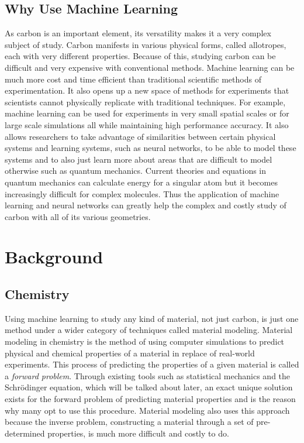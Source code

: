 \documentclass[12pt, abstract = true]{scrartcl}
\begin{document}
\subsection{Why Use Machine Learning}
As carbon is an important element, its versatility makes it a very
complex subject of study. Carbon manifests in various physical forms,
called allotropes, each with very different properties. Because of
this, studying carbon can be difficult and very expensive with conventional
methods. Machine learning can be much more cost and time efficient than traditional
scientific methods of experimentation. It also opens up a new space of methods for 
experiments that scientists cannot physically replicate with traditional techniques. 
For example, machine learning can be used for experiments in very small spatial
scales or for large scale simulations all while maintaining high
performance accuracy. It also allows researchers to take advantage of similarities 
between certain physical systems and learning systems, such as neural networks, to be 
able to model these systems and to also just learn more about areas that are difficult 
to model otherwise such as quantum mechanics. Current theories and equations in quantum 
mechanics can calculate energy for a singular atom but it becomes increasingly difficult 
for complex molecules. Thus the application of machine learning and neural networks 
can greatly help the complex and costly study of carbon with all of its various geometries.

\newpage

\section{Background}

\subsection{Chemistry}

Using machine learning to study any kind of material, not just carbon, 
is just one method under a wider category of techniques called material modeling. 
Material modeling in chemistry is the method of using computer simulations to predict 
physical and chemical properties of a material in replace of real-world experiments. 
This process of predicting the properties of a given material is called a \emph{forward 
problem}. Through existing tools such as statistical mechanics and the Schrödinger 
equation, which will be talked about later, an exact unique solution exists for the 
forward problem of predicting material properties and is the reason why many opt to 
use this procedure. Material modeling also uses this approach because the inverse 
problem, constructing a material through a set of pre-determined properties, 
is much more difficult and costly to do.
\end{document}
